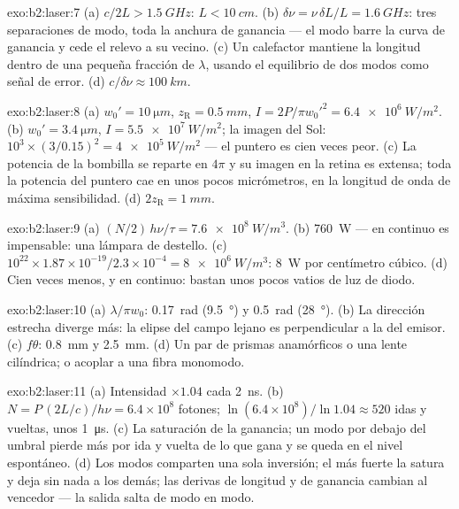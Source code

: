 \begin{solution}{exo:b2:laser:7}
(a) $c/2L > \qty{1.5}{GHz}$: $L < \qty{10}{cm}$. (b) $\delta\nu = \nu\,\delta L/L
= \qty{1.6}{GHz}$: tres separaciones de modo, toda la anchura de ganancia --- el modo
barre la curva de ganancia y cede el relevo a su vecino. (c) Un
calefactor mantiene la longitud dentro de una pequeña fracción de $\lambda$, usando el
equilibrio de dos modos como señal de error. (d) $c/\delta\nu \approx
\qty{100}{km}$.
\end{solution}

\begin{solution}{exo:b2:laser:8}
(a) $w_0' = \qty{10}{\micro m}$, $z_{\text{R}} = \qty{0.5}{mm}$, $I = 2P/\pi
w_0'^2 = \qty{6.4e6}{W/m^2}$. (b) $w_0' = \qty{3.4}{\micro m}$, $I =
\qty{5.5e7}{W/m^2}$; la imagen del Sol: $10^3 \times (3/0.15)^2 =
\qty{4e5}{W/m^2}$ --- el puntero es cien veces peor. (c) La potencia de la bombilla
se reparte en $4\pi$ y su imagen en la retina es extensa; toda la potencia del
puntero cae en unos pocos micrómetros, en la longitud de onda
de máxima sensibilidad. (d) $2z_{\text{R}} = \qty{1}{mm}$.
\end{solution}

\begin{solution}{exo:b2:laser:9}
(a) $(N/2)\,h\nu/\tau = \qty{7.6e8}{W/m^3}$. (b) \qty{760}{W} --- en continuo
es impensable: una lámpara de destello. (c) $10^{22} \times 1.87 \times
10^{-19}/2.3 \times 10^{-4} = \qty{8e6}{W/m^3}$: \qty{8}{W} por centímetro
cúbico. (d) Cien veces menos, y en continuo: bastan unos pocos vatios de
luz de diodo.
\end{solution}

\begin{solution}{exo:b2:laser:10}
(a) $\lambda/\pi w_0$: \qty{0.17}{rad} (\qty{9.5}{\degree}) y \qty{0.5}{rad}
(\qty{28}{\degree}). (b) La dirección estrecha diverge más: la
elipse del campo lejano es perpendicular a la del emisor. (c) $f\theta$:
\qty{0.8}{mm} y \qty{2.5}{mm}. (d) Un par de prismas anamórficos o una
lente cilíndrica; o acoplar a una fibra monomodo.
\end{solution}

\begin{solution}{exo:b2:laser:11}
(a) Intensidad $\times 1.04$ cada \qty{2}{ns}. (b) $N = P\,(2L/c)/h\nu =
6.4 \times 10^8$ fotones; $\ln(6.4 \times 10^8)/\ln 1.04 \approx 520$ idas
y vueltas, unos \qty{1}{\micro s}. (c) La saturación de la ganancia; un modo por debajo del
umbral pierde más por ida y vuelta de lo que gana y se queda en el
nivel espontáneo. (d) Los modos comparten una sola inversión; el más fuerte
la satura y deja sin nada a los demás; las derivas de longitud y de ganancia cambian
al vencedor --- la salida salta de modo en modo.
\end{solution}

